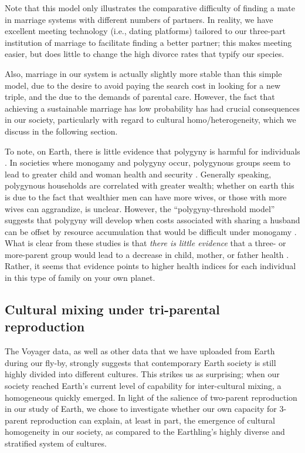 \documentclass{report}
\begin{document}
Note that this model only illustrates the comparative difficulty of finding a mate in marriage systems with different numbers of partners. In reality, we have excellent meeting technology (i.e., dating platforms) tailored to our three-part institution of marriage to facilitate finding a better partner; this makes meeting easier, but does little to change the high divorce rates that typify our species.

Also, marriage in our system is actually slightly more stable than this simple model, due to the desire to avoid paying the search cost in looking for a new triple, and the due to the demands of parental care. However, the fact that achieving a sustainable marriage has low probability has had crucial consequences in our society, particularly with regard to cultural homo/heterogeneity, which we discuss in the following section.

To note, on Earth, there is little evidence that polygyny is harmful for individuals \cite{Mulder1990, Sear2002, Lawson13827}. In societies where monogamy and polygyny occur, polygynous groups seem to lead to greater child and woman health and security \cite{Mulder1990}. Generally speaking, polygynous households are correlated with greater wealth; whether on earth this is due to the fact that wealthier men can have more wives, or those with more wives can aggrandize, is unclear. However, the ``polygyny-threshold model'' suggests that polygyny will develop when costs associated with sharing a husband can be offset by resource accumulation that would be difficult under monogamy \cite{Lawson13827}. What is clear from these studies is that \textit{there is little evidence} that a three- or more-parent group would lead to a decrease in child, mother, or father health \cite{Lawson13827, Mulder1990}. Rather, it seems that evidence points to higher health indices for each individual in this type of family on your own planet.

\subsection*{Cultural mixing under tri-parental reproduction}
The Voyager data, as well as other data that we have uploaded from Earth during our fly-by, strongly suggests that contemporary Earth society is still highly divided into different cultures. This strikes us as surprising; when our society reached Earth's current level of capability for inter-cultural mixing, a homogeneous quickly emerged. In light of the salience of two-parent reproduction in our study of Earth, we chose to investigate whether our own capacity for $3$-parent reproduction can explain, at least in part, the emergence of cultural homogeneity in our society, as compared to the Earthling's highly diverse and stratified system of cultures.\par 
\end{document}
